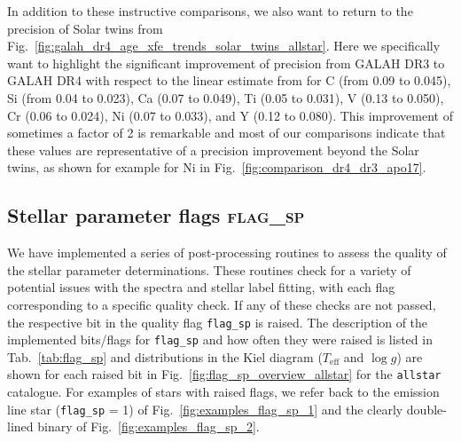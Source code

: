 \documentclass[
  journal=pasa,
  manuscript=research-paper, %
  year=2024,
  volume=37
]{cup-journal}
\newcommand{\Teff}{$T_\mathrm{eff}$\xspace}
\newcommand{\logg}{$\log g$\xspace}
\begin{document}
In addition to these instructive comparisons, we also want to return to the precision of Solar twins from Fig.~\ref{fig:galah_dr4_age_xfe_trends_solar_twins_allstar}. Here we specifically want to highlight the significant improvement of precision from GALAH DR3 to GALAH DR4 with respect to the linear estimate from \citet{Bedell2018} for C (from 0.09 to 0.045), Si (from 0.04 to 0.023), Ca (0.07 to 0.049), Ti (0.05 to 0.031), V (0.13 to 0.050), Cr (0.06 to 0.024), Ni (0.07 to 0.033), and Y (0.12 to 0.080). This improvement of sometimes a factor of 2 is remarkable and most of our comparisons indicate that these values are representative of a precision improvement beyond the Solar twins, as shown for example for Ni in Fig.~\ref{fig:comparison_dr4_dr3_apo17}.

\subsection{Stellar parameter flags \textsc{flag\_sp}}
\label{sec:flag_sp}

We have implemented a series of post-processing routines to assess the quality of the stellar parameter determinations. These routines check for a variety of potential issues with the spectra and stellar label fitting, with each flag corresponding to a specific quality check. If any of these checks are not passed, the respective bit in the quality flag \texttt{flag\_sp} is raised. The description of the implemented bits/flags for \texttt{flag\_sp} and how often they were raised is listed in Tab.~\ref{tab:flag_sp} and distributions in the Kiel diagram (\Teff and \logg) are shown for each raised bit in Fig.~\ref{fig:flag_sp_overview_allstar} for the \texttt{allstar} catalogue. For examples of stars with raised flags, we refer back to the emission line star (\texttt{flag\_sp} = 1) of Fig.~\ref{fig:examples_flag_sp_1} and the clearly double-lined binary of Fig.~\ref{fig:examples_flag_sp_2}.


\end{document}

